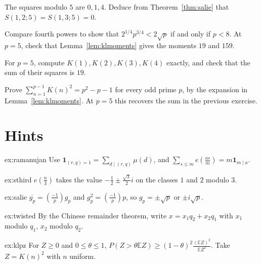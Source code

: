 \begin{exercise}[$\star$]\label{ex:v14-extra-05-1}
The squares modulo $5$ are $0,1,4$. Deduce from Theorem~\ref{thm:salie} that $S(1,2;5)=S(1,3;5)=0$.
\end{exercise}

\begin{exercise}[$\star$]\label{ex:v14-extra-05-2}
Compare fourth powers to show that $2^{1/4}p^{3/4}<2\sqrt p$ if and only if $p<8$. At $p=5$, check that Lemma~\ref{lem:klmoments} gives the moments $19$ and $159$.
\end{exercise}

\begin{exercise}[$\star\star$]\label{ex:v14-extra-05-3}
For $p=5$, compute $K(1),K(2),K(3),K(4)$ exactly, and check that the sum of their squares is $19$.
\end{exercise}

\begin{exercise}[$\star\star$]\label{ex:v14-extra-05-4}
Prove $\sum_{n=1}^{p-1}K(n)^2=p^2-p-1$ for every odd prime $p$, by the expansion in Lemma~\ref{lem:klmoments}. At $p=5$ this recovers the sum in the previous exercise.
\end{exercise}

\section{Hints}

\begin{hint}{ex:ramanujan}
Use $\mathbf 1_{(r,q)=1}=\sum_{d\mid(r,q)}\mu(d)$, and $\sum_{s\le m}e(\frac{as}m)=m\mathbf 1_{m\mid a}$.
\end{hint}

\begin{hint}{ex:sthird}
$e(\frac n3)$ takes the value $-\frac12\pm\frac{\sqrt3}2i$ on the classes $1$ and $2$ modulo $3$.
\end{hint}

\begin{hint}{ex:salie}
$\overline{g_p}=(\frac{-1}p)g_p$ and $g_p^2=(\frac{-1}p)p$, so $g_p=\pm\sqrt p$ or $\pm i\sqrt p$.
\end{hint}

\begin{hint}{ex:twisted}
By the Chinese remainder theorem, write $x=x_1q_2+x_2q_1$ with $x_1$ modulo $q_1$, $x_2$ modulo $q_2$.
\end{hint}

\begin{hint}{ex:klpz}
For $Z\ge0$ and $0\le\theta\le1$, $P(Z>\theta\mathbb EZ)\ge(1-\theta)^2\frac{(\mathbb EZ)^2}{\mathbb EZ^2}$. Take $Z=K(n)^2$ with $n$ uniform.
\end{hint}

